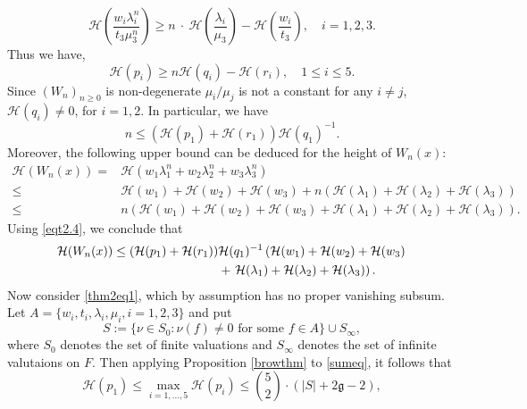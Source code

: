 \documentclass[12pt]{amsart}
\begin{document}
    \begin{equation*}
        \mathcal{H}\left( \frac{w_i\lambda_i^n}{t_3\mu_3^n}\right)\geq n ~\cdot ~\mathcal{H}\left( \frac{\lambda_i}{\mu_3}\right)-\mathcal{H}\left( \frac{w_i}{t_3}\right), \quad i=1,2,3.
    \end{equation*} Thus we have, 
    \begin{equation*}
        \mathcal{H}(p_i)\geq n \mathcal{H}(q_i)- \mathcal{H}(r_i), \quad 1\leq i\leq 5.
    \end{equation*}
    Since $(W_n)_{n\geq 0}$ is non-degenerate $\mu_i/\mu_j$ is not a constant for any $i\neq j$, $\mathcal{H}(q_i)\neq 0$, for $i=1,2$. In particular, we have 
    \begin{equation}\label{eqt2.4}
        n\leq \left( \mathcal{H}(p_1)+\mathcal{H}(r_1)\right)\mathcal{H}(q_1)^{-1}.
    \end{equation}
    Moreover, the following upper bound can be deduced for the height of $W_n(x)$:
    \begin{align*}
        \mathcal{H}(W_n(x))=&\mathcal{H}(w_1\lambda_1^n+w_2\lambda_2^n+w_3\lambda_3^n)\\
        \leq & \mathcal{H}(w_1)+\mathcal{H}(w_2)+\mathcal{H}(w_3)+ n(\mathcal{H}(\lambda_1)+\mathcal{H}(\lambda_2)+\mathcal{H}(\lambda_3))\\
        \leq &n \left( \mathcal{H}(w_1)+\mathcal{H}(w_2)+\mathcal{H}(w_3)+\mathcal{H}(\lambda_1)+\mathcal{H}(\lambda_2)+\mathcal{H}(\lambda_3) \right).
    \end{align*}
    Using \eqref{eqt2.4}, we conclude that
    \begin{align}\label{eqt2.5}
        \mathcal{H}(W_n(x))\leq \left( \mathcal{H}(p_1)+\mathcal{H}(r_1)\right)&\mathcal{H}(q_1)^{-1}\left(\mathcal{H}(w_1)+\mathcal{H}(w_2)+\mathcal{H}(w_3)\right.\\
        &+\left.\mathcal{H}(\lambda_1)+\mathcal{H}(\lambda_2)+\mathcal{H}(\lambda_3)\right). \notag
    \end{align}
    Now consider \eqref{thm2eq1}, which by assumption has no proper vanishing subsum. Let $A=\{w_i, t_i, \lambda_i, \mu_i, i=1,2,3\}$ and put
        \[S:=\{\nu \in S_0: \nu (f)\neq 0 \text{ for some } f\in A\}\cup S_{\infty},\]
        where $S_0$ denotes the set of finite valuations and $S_{\infty}$ denotes the set of infinite valutaions on $F$. Then applying Proposition \ref{browthm} to \eqref{sumeq}, it follows that
        \begin{equation*}
          \mathcal{H}(p_1) \leq \max_{i=1, \ldots, 5} \mathcal{H}(p_i) \leq \binom{5}{2}\cdot \left(|S| + 2\mathfrak{g} - 2\right),
        \end{equation*}
\end{document}
